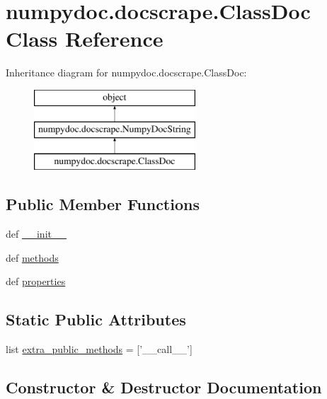 \hypertarget{classnumpydoc_1_1docscrape_1_1ClassDoc}{}\section{numpydoc.\+docscrape.\+Class\+Doc Class Reference}
\label{classnumpydoc_1_1docscrape_1_1ClassDoc}
Inheritance diagram for numpydoc.\+docscrape.\+Class\+Doc\+:\begin{figure}[H]
\begin{center}
\leavevmode
\includegraphics[height=3.000000cm]{classnumpydoc_1_1docscrape_1_1ClassDoc}
\end{center}
\end{figure}
\subsection*{Public Member Functions}
\begin{DoxyCompactItemize}
\item 
def \hyperlink{classnumpydoc_1_1docscrape_1_1ClassDoc_a7116e68aae515551391f8b8557a0be5c}{\+\_\+\+\_\+init\+\_\+\+\_\+}
\item 
def \hyperlink{classnumpydoc_1_1docscrape_1_1ClassDoc_ad14fa821348eccb408152db5852e361f}{methods}
\item 
def \hyperlink{classnumpydoc_1_1docscrape_1_1ClassDoc_a6873f7100f0a97aa9694da0d1d2f96bd}{properties}
\end{DoxyCompactItemize}
\subsection*{Static Public Attributes}
\begin{DoxyCompactItemize}
\item 
list \hyperlink{classnumpydoc_1_1docscrape_1_1ClassDoc_a7e8956388fa62f62c9c78dbdd6757825}{extra\+\_\+public\+\_\+methods} = \mbox{[}'\+\_\+\+\_\+call\+\_\+\+\_\+'\mbox{]}
\end{DoxyCompactItemize}


\subsection{Constructor \& Destructor Documentation}
\hypertarget{classnumpydoc_1_1docscrape_1_1ClassDoc_a7116e68aae515551391f8b8557a0be5c}{}
